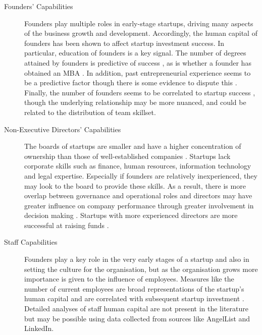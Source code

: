 \begin{description}

\item[Founders' Capabilities]

Founders play multiple roles in early-stage startups, driving many aspects of the business growth and development. Accordingly, the human capital of founders has been shown to affect startup investment success. In particular, education of founders is a key signal. The number of degrees attained by founders is predictive of success \cite{beckwith2016,gimmon2010}, as is whether a founder has obtained an MBA \cite{beckwith2016}. In addition, past entrepreneurial experience seems to be a predictive factor \cite{gimmon2010} though there is some evidence to dispute this \cite{shan2014}. Finally, the number of founders seems to be correlated to startup success \cite{beckwith2016}, though the underlying relationship may be more nuanced, and could be related to the distribution of team skillset.

\item[Non-Executive Directors' Capabilities]

The boards of startups are smaller and have a higher concentration of ownership than those of well-established companies \cite{ingley2007}. Startups lack corporate skills such as finance, human resources, information technology and legal expertise. Especially if founders are relatively inexperienced, they may look to the board to provide these skills. As a result, there is more overlap between governance and operational roles and directors may have greater influence on company performance through greater involvement in decision making \cite{ingley2007}. Startups with more experienced directors are more successful at raising funds \cite{baum2004}.

\item[Staff Capabilities]

Founders play a key role in the very early stages of a startup and also in setting the culture for the organisation, but as the organisation grows more importance is given to the influence of employees. Measures like the number of current employees are broad representations of the startup's human capital and are correlated with subsequent startup investment \cite{beckwith2016,an2015,conti2013}. Detailed analyses of staff human capital are not present in the literature but may be possible using data collected from sources like AngelList and LinkedIn.

\end{description}

